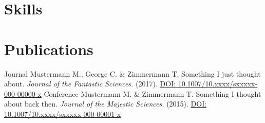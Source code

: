 \documentclass{../km_cv}
\begin{document}
\section{Skills}
%
%
%
%
%
\section{Publications}
%
\addpublication
    {Journal}
    {Mustermann M., George C. \& Zimmermann T. Something I just thought about. \textit{Journal of the Fantastic Sciences.} (2017). {\href{https://doi.org/10.xxxx/sxxxxx-000-00000-x}{\textcolor{tertiarycolor}{DOI: 10.1007/10.xxxx/sxxxxx-000-00000-x}}}}
%
\addpublication
    {Conference}
    {Mustermann M. \& Zimmermann T. Something I thought about back then. \textit{Journal of the Majestic Sciences.} (2015). {\href{https://doi.org/10.xxxx/sxxxxx-000-00001-x}{\textcolor{tertiarycolor}{DOI: 10.1007/10.xxxx/sxxxxx-000-00001-x}}}}
%
\end{document}
